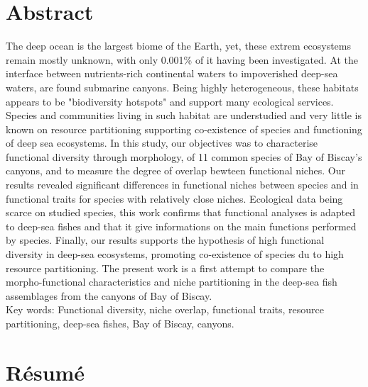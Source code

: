 
\section*{Abstract}

The deep ocean is the largest biome of the Earth, yet, these extrem ecosystems remain mostly unknown, with only 0.001\% of it having been investigated. At the interface between nutrients-rich continental waters to impoverished deep-sea waters, are found submarine canyons. Being highly heterogeneous, these habitats appears to be "biodiversity hotspots" and support many ecological services. Species and communities living in such habitat are understudied and very little is known on resource partitioning supporting co-existence of species and functioning of deep sea ecosystems. In this study, our objectives was to characterise functional diversity through morphology, of 11 common species of Bay of Biscay's canyons, and to measure the degree of overlap bewteen functional niches. Our results revealed significant differences in functional niches between species and in functional traits for species with relatively close niches. Ecological data being scarce on studied species, this work confirms that functional analyses is adapted to deep-sea fishes and that it give informations on the main functions performed by species. Finally, our results supports the hypothesis of high functional diversity in deep-sea ecosystems,  promoting co-existence of species du to high resource partitioning. The present work is a first attempt to compare the morpho-functional characteristics and niche partitioning in the deep-sea fish assemblages from the canyons of Bay of Biscay.\\


Key words: Functional diversity, niche overlap, functional traits, resource partitioning, deep-sea fishes, Bay of Biscay, canyons.

\section*{Résumé}

